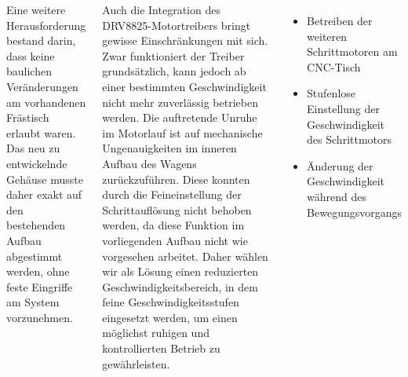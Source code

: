 \documentclass[25pt,a0paper, portrait]{tikzposter}
\begin{document}
\begin{columns}
{{			Eine weitere Herausforderung bestand darin, dass keine baulichen Veränderungen am vorhandenen Frästisch erlaubt waren. Das neu zu entwickelnde Gehäuse musste daher exakt auf den bestehenden Aufbau abgestimmt werden, ohne feste Eingriffe am System vorzunehmen.
			 
            Auch die Integration des DRV8825-Motortreibers bringt gewisse Einschränkungen mit sich. Zwar funktioniert der Treiber grundsätzlich, kann jedoch ab einer bestimmten Geschwindigkeit nicht mehr zuverlässig betrieben werden. Die auftretende Unruhe im Motorlauf ist auf mechanische Ungenauigkeiten im inneren Aufbau des Wagens zurückzuführen. Diese konnten durch die Feineinstellung der Schrittauflösung nicht behoben werden, da diese Funktion im vorliegenden Aufbau nicht wie vorgesehen arbeitet. Daher wählen wir als Lösung einen reduzierten Geschwindigkeitsbereich, in dem feine Geschwindigkeitsstufen eingesetzt werden, um einen möglichst ruhigen und kontrollierten Betrieb zu gewährleisten.
		}
		{
			\begin{itemize}
				\item Betreiben der weiteren Schrittmotoren am CNC-Tisch
				\item Stufenlose Einstellung der Geschwindigkeit des Schrittmotors
				\item Änderung der Geschwindigkeit während des Bewegungsvorgangs
			\end{itemize}
			
		}
	}


	{
		{
			\vspace{-3.5cm}
					\vspace{1cm}
					
}}
\end{columns}
\end{document}
